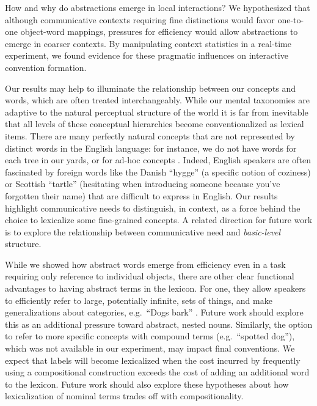 How and why do abstractions emerge in local interactions? We hypothesized that although communicative contexts requiring fine distinctions would favor one-to-one object-word mappings, pressures for efficiency would allow abstractions to emerge in coarser contexts. By manipulating context statistics in a real-time experiment, we found evidence for these pragmatic influences on interactive convention formation.

Our results may help to illuminate the relationship between our concepts and words, which are often treated interchangeably. While our mental taxonomies are adaptive to the natural perceptual structure of the world \cite{MervisRosch81_CategorizationReview} %
it is far from inevitable that all levels of these conceptual hierarchies become conventionalized as lexical items. There are many perfectly natural concepts that are not represented by distinct words in the English language: for instance, we do not have words for each tree in our yards, or for ad-hoc concepts %
\cite{Barsalou83_AdHocCategories}. Indeed, English speakers are often fascinated by foreign words like the Danish ``hygge'' (a specific notion of coziness) or Scottish ``tartle'' (hesitating when introducing someone because you've forgotten their name) that are difficult to express in English.
Our results highlight communicative needs to distinguish, in context, as a force behind the choice to lexicalize some fine-grained concepts. 
A related direction for future work is to explore the relationship between communicative need and \emph{basic-level} structure.

While we showed how abstract words emerge from efficiency even in a task requiring only reference to individual objects, there are other clear functional advantages to having abstract terms in the lexicon. For one, they allow speakers to efficiently refer to large, potentially infinite, sets of things, and make generalizations about categories, e.g.\ ``Dogs bark'' \cite{TesslerGoodman16_Generics}. Future work should explore this as an additional pressure toward abstract, nested nouns.
Similarly, the option to refer to more specific concepts with compound terms (e.g.~``spotted dog''), which was not available in our experiment, may impact final conventions.
We expect that labels will become lexicalized when the cost incurred by frequently using a compositional construction exceeds the cost of adding an additional word to the lexicon. 
Future work should also explore these hypotheses about how lexicalization of nominal terms trades off with compositionality. 


